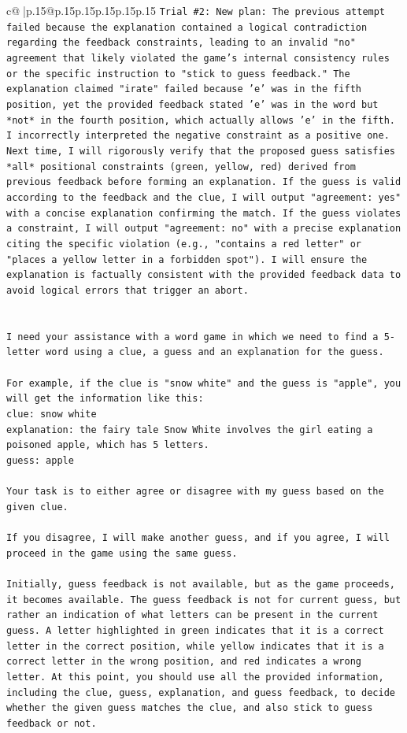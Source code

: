 \documentclass{article}
\begin{document}
{\begin{supertabular}{c@{$\;$}|p{.15\linewidth}@{}p{.15\linewidth}p{.15\linewidth}p{.15\linewidth}p{.15\linewidth}p{.15\linewidth}}
{{{\texttt{Trial \#2: New plan: The previous attempt failed because the explanation contained a logical contradiction regarding the feedback constraints, leading to an invalid "no" agreement that likely violated the game's internal consistency rules or the specific instruction to "stick to guess feedback." The explanation claimed "irate" failed because 'e' was in the fifth position, yet the provided feedback stated 'e' was in the word but *not* in the fourth position, which actually allows 'e' in the fifth. I incorrectly interpreted the negative constraint as a positive one. Next time, I will rigorously verify that the proposed guess satisfies *all* positional constraints (green, yellow, red) derived from previous feedback before forming an explanation. If the guess is valid according to the feedback and the clue, I will output "agreement: yes" with a concise explanation confirming the match. If the guess violates a constraint, I will output "agreement: no" with a precise explanation citing the specific violation (e.g., "contains a red letter" or "places a yellow letter in a forbidden spot"). I will ensure the explanation is factually consistent with the provided feedback data to avoid logical errors that trigger an abort.} \\
\\ 
\\ 
\texttt{I need your assistance with a word game in which we need to find a 5{-}letter word using a clue, a guess and an explanation for the guess.} \\
\\ 
\texttt{For example, if the clue is "snow white" and the guess is "apple", you will get the information like this:} \\
\texttt{clue: snow white} \\
\texttt{explanation: the fairy tale Snow White involves the girl eating a poisoned apple, which has 5 letters.} \\
\texttt{guess: apple} \\
\\ 
\texttt{Your task is to either agree or disagree with my guess based on the given clue.} \\
\\ 
\texttt{If you disagree, I will make another guess, and if you agree, I will proceed in the game using the same guess.} \\
\\ 
\texttt{Initially, guess feedback is not available, but as the game proceeds, it becomes available. The guess feedback is not for current guess, but rather an indication of what letters can be present in the current guess. A letter highlighted in green indicates that it is a correct letter in the correct position, while yellow indicates that it is a correct letter in the wrong position, and red indicates a wrong letter. At this point, you should use all the provided information, including the clue, guess, explanation, and guess feedback, to decide whether the given guess matches the clue, and also stick to guess feedback or not.} \\
}}}
\end{supertabular}}
\end{document}
